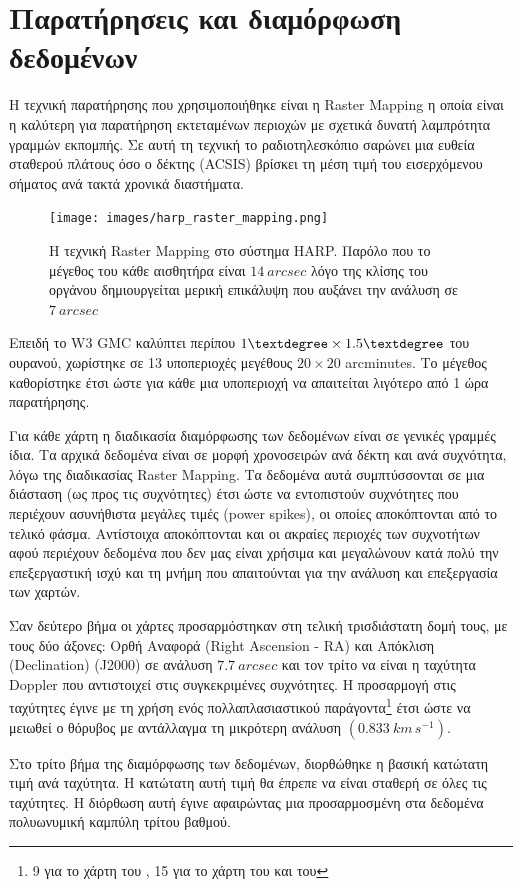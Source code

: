 \documentclass[a4paper,12pt]{memoir}
\begin{document}
\section{Παρατήρησεις και διαμόρφωση δεδομένων}
Η τεχνική παρατήρησης που χρησιμοποιήθηκε είναι η Raster Mapping η οποία είναι η καλύτερη για παρατήρηση εκτεταμένων περιοχών με σχετικά δυνατή λαμπρότητα γραμμών εκπομπής. Σε αυτή τη τεχνική το ραδιοτηλεσκόπιο σαρώνει μια ευθεία σταθερού πλάτους όσο ο δέκτης (ACSIS) βρίσκει τη μέση τιμή του εισερχόμενου σήματος ανά τακτά χρονικά διαστήματα. 


\begin{figure}[h!]
	\centering
	\texttt{[image: images/harp\_raster\_mapping.png]}
	\caption{Η τεχνική Raster Mapping στο σύστημα HARP. Παρόλο που το μέγεθος του κάθε αισθητήρα είναι $14\ arcsec$ λόγο της κλίσης του οργάνου δημιουργείται μερική επικάλυψη που αυξάνει την ανάλυση σε $7\ arcsec$ }
\end{figure}

Επειδή το W3 GMC καλύπτει περίπου $1 \textdegree \times 1.5 \textdegree$ του ουρανού, χωρίστηκε σε 13 υποπεριοχές μεγέθους $20 \times 20$ arcminutes. Το μέγεθος καθορίστηκε έτσι ώστε για κάθε μια υποπεριοχή να απαιτείται λιγότερο από 1 ώρα παρατήρησης. 

Για κάθε χάρτη η διαδικασία διαμόρφωσης των δεδομένων είναι σε γενικές γραμμές ίδια. Τα αρχικά δεδομένα είναι σε μορφή χρονοσειρών ανά δέκτη και ανά συχνότητα, λόγω της διαδικασίας Raster Mapping. Τα δεδομένα αυτά συμπτύσσονται σε μια διάσταση (ως προς τις συχνότητες) έτσι ώστε να εντοπιστούν συχνότητες που περιέχουν ασυνήθιστα μεγάλες τιμές (power spikes), οι οποίες αποκόπτονται από το τελικό φάσμα. Αντίστοιχα αποκόπτονται και οι ακραίες περιοχές των συχνοτήτων αφού περιέχουν δεδομένα που δεν μας είναι χρήσιμα και μεγαλώνουν κατά πολύ την επεξεργαστική ισχύ και τη μνήμη που απαιτούνται για την ανάλυση και επεξεργασία των χαρτών.

Σαν δεύτερο βήμα οι χάρτες προσαρμόστηκαν στη τελική τρισδιάστατη δομή τους, με τους δύο άξονες: Ορθή Αναφορά (Right Ascension - RA) και Απόκλιση (Declination) (J2000) σε ανάλυση $7.7\ arcsec$ και τον τρίτο να είναι η ταχύτητα Doppler που αντιστοιχεί στις συγκεκριμένες συχνότητες. Η προσαρμογή στις ταχύτητες έγινε με τη χρήση ενός πολλαπλασιαστικού παράγοντα\footnote{9 για το χάρτη του , 15 για το χάρτη του  και του } έτσι ώστε να μειωθεί ο θόρυβος με αντάλλαγμα τη μικρότερη ανάλυση $(0.833\ km\, s^{-1})$. 

Στο τρίτο βήμα της διαμόρφωσης των δεδομένων, διορθώθηκε η βασική κατώτατη τιμή ανά ταχύτητα. Η κατώτατη αυτή τιμή θα έπρεπε να είναι σταθερή σε όλες τις ταχύτητες. Η διόρθωση αυτή έγινε αφαιρώντας μια προσαρμοσμένη στα δεδομένα πολυωνυμική καμπύλη τρίτου βαθμού.
\end{document}
